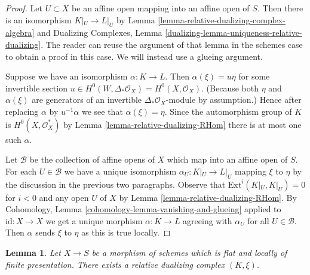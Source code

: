 \documentclass{stacks-project}
\theoremstyle{plain}
\newtheorem{lemma}[subsection]{Lemma}
\theoremstyle{definition}
\theoremstyle{remark}
\numberwithin{equation}{subsection}
\begin{document}
\begin{proof}
Let $U \subset X$ be an affine open mapping into an
affine open of $S$. Then there is an isomorphism
$K|_U \to L|_U$ by Lemma \ref{lemma-relative-dualizing-complex-algebra} and
Dualizing Complexes, Lemma
\ref{dualizing-lemma-uniqueness-relative-dualizing}.
The reader can reuse the argument of that lemma
in the schemes case to obtain a proof in this case.
We will instead use a glueing argument.

\medskip\noindent
Suppose we have an isomorphism $\alpha : K \to L$.
Then $\alpha(\xi) = u \eta$ for some invertible section
$u \in H^0(W, \Delta_*\mathcal{O}_X) = H^0(X, \mathcal{O}_X)$.
(Because both $\eta$ and $\alpha(\xi)$ are generators
of an invertible $\Delta_*\mathcal{O}_X$-module by assumption.)
Hence after replacing $\alpha$ by $u^{-1}\alpha$
we see that $\alpha(\xi) = \eta$.
Since the automorphism group of
$K$ is $H^0(X, \mathcal{O}_X^*)$ by Lemma \ref{lemma-relative-dualizing-RHom}
there is at most one such $\alpha$.

\medskip\noindent
Let $\mathcal{B}$ be the collection of affine opens of
$X$ which map into an affine open of $S$. For each $U \in \mathcal{B}$
we have a unique isomorphism $\alpha_U : K|_U \to L|_U$
mapping $\xi$ to $\eta$ by the discussion in the previous
two paragraphs.
Observe that $\text{Ext}^i(K|_U, K|_U) = 0$ for $i < 0$
and any open $U$ of $X$ by Lemma \ref{lemma-relative-dualizing-RHom}.
By Cohomology, Lemma \ref{cohomology-lemma-vanishing-and-glueing}
applied to $\text{id} : X \to X$ we get a unique morphism
$\alpha : K \to L$ agreeing
with $\alpha_U$ for all $U \in \mathcal{B}$.
Then $\alpha$ sends $\xi$ to $\eta$ as this is true locally.
\end{proof}

\begin{lemma}
\label{lemma-existence-relative-dualizing}
Let $X \to S$ be a morphism of schemes which is
flat and locally of finite presentation.
There exists a relative dualizing complex $(K, \xi)$.
\end{lemma}
\end{document}
